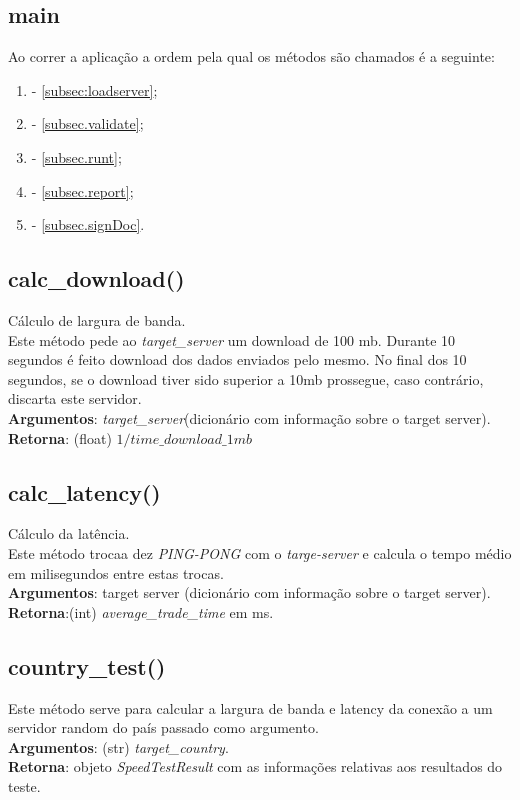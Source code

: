 \documentclass{report}
\begin{document}
\subsection{main}
Ao correr a aplicação a ordem pela qual os métodos são chamados é a seguinte:
\begin{enumerate}
\item {} - \autoref{subsec:loadserver};
\item {} - \autoref{subsec.validate};
\item {} - \autoref{subsec.runt};
\item {} - \autoref{subsec.report};
\item {} - \autoref{subsec.signDoc}.
\end{enumerate}

\subsection{calc\_download()}
\label{subsec.download}
Cálculo de largura de banda.\\
Este método pede ao \textit{target\_server} um download de 100 mb. Durante 10 segundos é feito download dos dados enviados pelo mesmo. No final dos 10 segundos, se o download tiver sido superior a 10mb prossegue, caso contrário, discarta este servidor.\\
\textbf{Argumentos}: \textit{target\_server}(dicionário com informação sobre o target server). 
\textbf{Retorna}: (float) $1/\textit{time\_download\_1mb}$

\subsection{calc\_latency()}
\label{subsec.latency}
Cálculo da latência.\\ 
Este método trocaa dez \textit{PING-PONG} com o \textit{targe-server} e calcula o tempo médio em milisegundos entre estas trocas.\\
\textbf{Argumentos}: target server (dicionário com informação sobre o target server). 
\textbf{Retorna}:(int) \textit{average\_trade\_time} em ms.

\subsection{country\_test()}
\label{subsec.countrytest}
Este método serve para calcular a largura de banda e latency da conexão a um servidor random do país passado como argumento.\\ 
\textbf{Argumentos}: (str) \textit{target\_country}.\\
\textbf{Retorna}: objeto \textit{SpeedTestResult} com as informações relativas aos resultados do teste.
\end{document}
